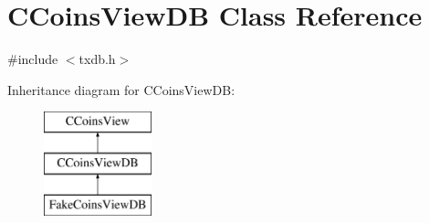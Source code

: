 \hypertarget{class_c_coins_view_d_b}{}\section{C\+Coins\+View\+DB Class Reference}
\label{class_c_coins_view_d_b}


{\ttfamily \#include $<$txdb.\+h$>$}

Inheritance diagram for C\+Coins\+View\+DB\+:\begin{figure}[H]
\begin{center}
\leavevmode
\includegraphics[height=3.000000cm]{class_c_coins_view_d_b}
\end{center}
\end{figure}
